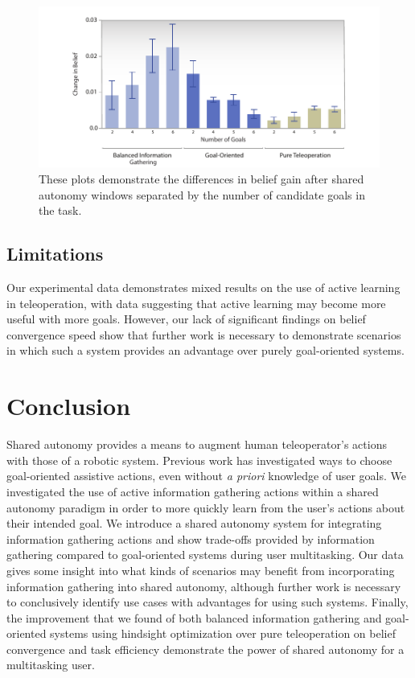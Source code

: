 \documentclass[conference]{IEEEtran}
\begin{document}
\begin{figure}
\includegraphics[width=\columnwidth]{figures/Info_Gain_By_Goal.pdf}
\caption{These plots demonstrate the differences in belief gain after shared autonomy windows separated by the number of candidate goals in the task.}
\label{goal_effect}
\end{figure}

\subsection{Limitations}

Our experimental data demonstrates mixed results on the use of active learning in teleoperation, with data suggesting that active learning may become more useful with more goals. However, our lack of significant findings on belief convergence speed show that further work is necessary to demonstrate scenarios in which such a system provides an advantage over purely goal-oriented systems.

\section{Conclusion}

Shared autonomy provides a means to augment human teleoperator's actions with those of a robotic system. Previous work has investigated ways to choose goal-oriented assistive actions, even without \textit{a priori} knowledge of user goals. We investigated the use of active information gathering actions within a shared autonomy paradigm in order to more quickly learn from the user's actions about their intended goal. We introduce a shared autonomy system for integrating information gathering actions and show trade-offs provided by information gathering compared to goal-oriented systems during user multitasking. Our data gives some insight into what kinds of scenarios may benefit from incorporating information gathering into shared autonomy, although further work is necessary to conclusively identify use cases with advantages for using such systems. Finally, the improvement that we found of both balanced information gathering and goal-oriented systems using hindsight optimization over pure teleoperation on belief convergence and task efficiency demonstrate the power of shared autonomy for a multitasking user.



\end{document}
